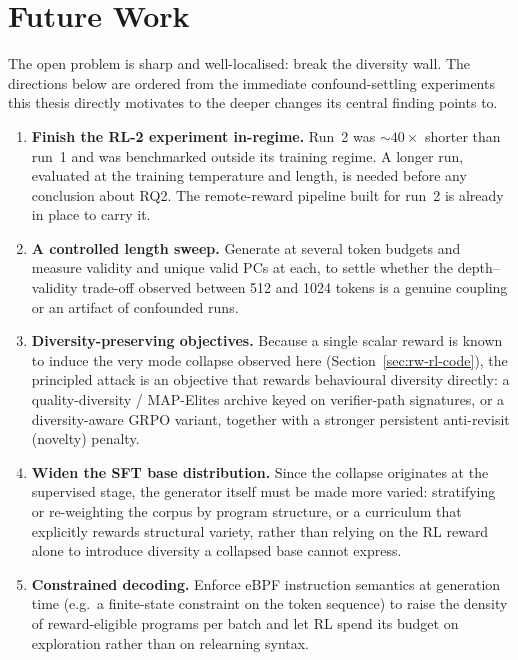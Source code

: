 \section{Future Work}
\label{sec:future-work}

The open problem is sharp and well-localised: break the diversity wall. The
directions below are ordered from the immediate confound-settling experiments this
thesis directly motivates to the deeper changes its central finding points to.

\begin{enumerate}

  \item \textbf{Finish the RL-2 experiment in-regime.}
        Run~2 was ${\sim}40\times$ shorter than run~1 and was benchmarked outside
        its training regime. A longer run, evaluated at the training temperature
        and length, is needed before any conclusion about RQ2. The remote-reward
        pipeline built for run~2 is already in place to carry it.

  \item \textbf{A controlled length sweep.}
        Generate at several token budgets and measure validity and unique valid PCs
        at each, to settle whether the depth--validity trade-off observed between
        512 and 1024 tokens is a genuine coupling or an artifact of confounded
        runs.

  \item \textbf{Diversity-preserving objectives.}
        Because a single scalar reward is known to induce the very mode collapse
        observed here (Section~\ref{sec:rw-rl-code}), the principled attack is an
        objective that rewards behavioural diversity directly: a
        quality-diversity / MAP-Elites archive keyed on verifier-path signatures,
        or a diversity-aware GRPO variant, together with a stronger persistent
        anti-revisit (novelty) penalty.

  \item \textbf{Widen the SFT base distribution.}
        Since the collapse originates at the supervised stage, the generator itself
        must be made more varied: stratifying or re-weighting the corpus by program
        structure, or a curriculum that explicitly rewards structural variety,
        rather than relying on the RL reward alone to introduce diversity a
        collapsed base cannot express.

  \item \textbf{Constrained decoding.}
        Enforce eBPF instruction semantics at generation time (e.g.\ a
        finite-state constraint on the token sequence) to raise the density of
        reward-eligible programs per batch and let RL spend its budget on
        exploration rather than on relearning syntax.

\end{enumerate}

